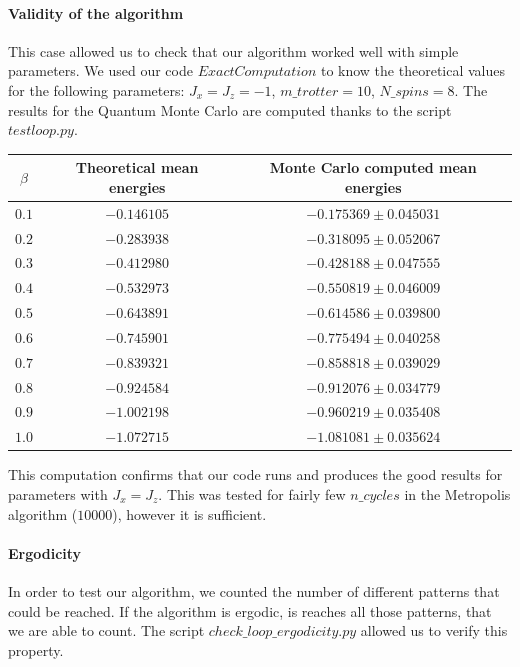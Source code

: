 \documentclass[a4paper,12pt,twoside]{article}
\begin{document}
	\paragraph{Validity of the algorithm} This case allowed us to check that our algorithm worked well with simple parameters.
	We used our code $ExactComputation$ to know the theoretical values for the following parameters: $J_x = J_z = - 1$,  $m\_trotter = 10$,  $N\_spins = 8$. The results for the Quantum Monte Carlo are computed thanks to the script $testloop.py$. \\
		\begin{tabular}[c]{| c || c | c |}
			\hline
			$\beta$ & Theoretical mean energies & Monte Carlo computed mean energies \\ \hline
			$0.1$ & $-0.146105$ & $-0.175369 \pm 0.045031$ \\ \hline
			$0.2$ & $-0.283938$ & $-0.318095 \pm 0.052067$ \\ \hline
			$0.3$ & $-0.412980$ & $-0.428188 \pm 0.047555$ \\ \hline
			$0.4$ & $-0.532973$ & $-0.550819 \pm 0.046009$ \\ \hline
			$0.5$ & $-0.643891$ & $-0.614586 \pm 0.039800$ \\ \hline
			$0.6$ & $-0.745901$ & $-0.775494 \pm 0.040258$ \\ \hline
			$0.7$ & $-0.839321$ & $-0.858818 \pm 0.039029$ \\ \hline
			$0.8$ & $-0.924584$ & $-0.912076 \pm 0.034779$ \\ \hline
			$0.9$ & $-1.002198$ & $-0.960219 \pm 0.035408$ \\ \hline
			$1.0$ & $-1.072715$ & $-1.081081 \pm 0.035624$ \\ \hline
		\end{tabular} 
	\newline
	This computation confirms that our code runs and produces the good results for parameters with $J_x = J_z$. This was tested for fairly few $n\_cycles$ in the Metropolis algorithm ($10000$), however it is sufficient.
	
	\paragraph{Ergodicity} In order to test our algorithm, we counted the number of different patterns that could be reached. If the algorithm is ergodic, is reaches all those patterns, that we are able to count. The script $check\_loop\_ergodicity.py$ allowed us to verify this property. 
	
\end{document}
